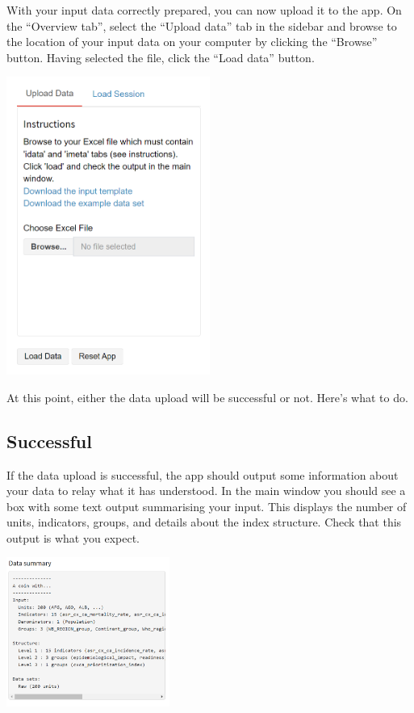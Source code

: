 \documentclass[
  letterpaper,
  DIV=11,
  numbers=noendperiod]{scrreprt}
\begin{document}
With your input data correctly prepared, you can now upload it to the
app. On the ``Overview tab'', select the ``Upload data'' tab in the
sidebar and browse to the location of your input data on your computer
by clicking the ``Browse'' button. Having selected the file, click the
``Load data'' button.

\includegraphics[width=0.5\textwidth,height=\textheight]{figs/data_input_4.png}

At this point, either the data upload will be successful or not. Here's
what to do.

\hypertarget{successful}{%
\subsection{Successful}\label{successful}}

If the data upload is successful, the app should output some information
about your data to relay what it has understood. In the main window you
should see a box with some text output summarising your input. This
displays the number of units, indicators, groups, and details about the
index structure. Check that this output is what you expect.

\includegraphics[width=0.4\textwidth,height=\textheight]{figs/data_input_5.png}
\end{document}
